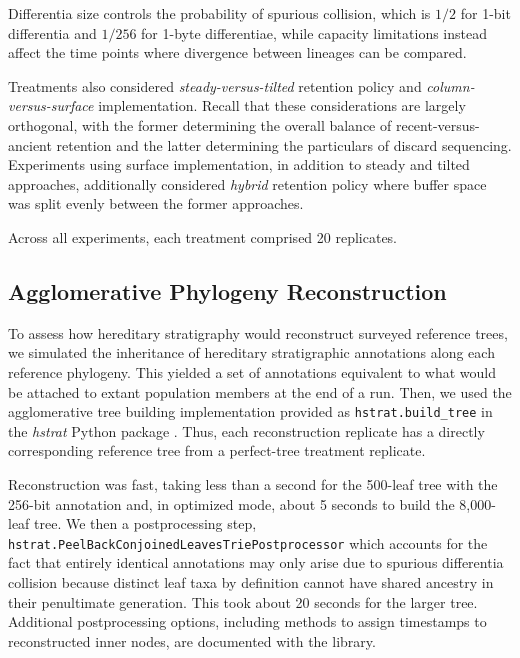 Differentia size controls the probability of spurious collision, which is $1/2$ for 1-bit differentia and $1/256$ for 1-byte differentiae, while capacity limitations instead affect the time points where divergence between lineages can be compared.

Treatments also considered \textit{steady-versus-tilted} retention policy and \textit{column-versus-surface} implementation.
Recall that these considerations are largely orthogonal, with the former determining the overall balance of recent-versus-ancient retention and the latter determining the particulars of discard sequencing.
Experiments using surface implementation, in addition to steady and tilted approaches, additionally considered \textit{hybrid} retention policy where buffer space was split evenly between the former approaches.

Across all experiments, each treatment comprised 20 replicates.

\subsection{Agglomerative Phylogeny Reconstruction}

To assess how hereditary stratigraphy would reconstruct surveyed reference trees, we simulated the inheritance of hereditary stratigraphic annotations along each reference phylogeny.
This yielded a set of annotations equivalent to what would be attached to extant population members at the end of a run.
Then, we used the agglomerative tree building implementation provided as \texttt{hstrat.build\_tree} in the \textit{hstrat} Python package \citep{moreno2022hstrat}.
Thus, each reconstruction replicate has a directly corresponding reference tree from a perfect-tree treatment replicate.

Reconstruction was fast, taking less than a second for the 500-leaf tree with the 256-bit annotation and, in optimized mode, about 5 seconds to build the 8,000-leaf tree.
We then a postprocessing step, \texttt{hstrat.{\allowbreak}Peel{\allowbreak}Back{\allowbreak}Conjoined{\allowbreak}Leave{\allowbreak}sTrie{\allowbreak}Postprocessor} which accounts for the fact that entirely identical annotations may only arise due to spurious differentia collision because distinct leaf taxa by definition cannot have shared ancestry in their penultimate generation.
This took about 20 seconds for the larger tree.
Additional postprocessing options, including methods to assign timestamps to reconstructed inner nodes, are documented with the library.

